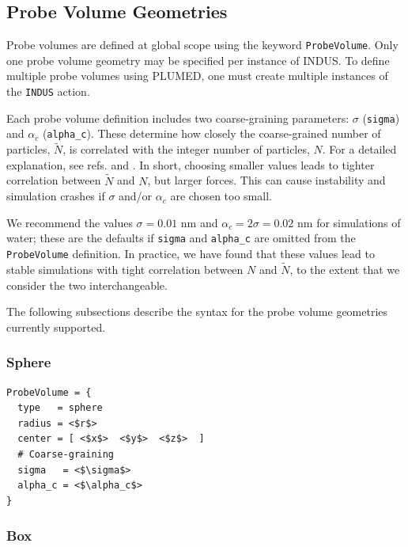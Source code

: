\documentclass[11pt,notitlepage]{article}
\begin{document}

\subsection{Probe Volume Geometries}

Probe volumes are defined at global scope using the keyword \texttt{ProbeVolume}. Only one probe volume geometry may be specified per instance of INDUS. To define multiple probe volumes using PLUMED, one must create multiple instances of the \texttt{INDUS} action.

Each probe volume definition includes two coarse-graining parameters: $\sigma$
(\texttt{sigma}) and $\alpha_c$ (\texttt{alpha\_c}). These determine how closely the coarse-grained number of particles, $\tilde{N}$, is correlated with the integer number of particles, $N$. For a detailed explanation, see refs. \cite{Patel2010} and \cite{Patel2012}. In short, choosing smaller values leads to tighter correlation between $\tilde{N}$ and $N$, but larger forces. This can cause instability and simulation crashes if $\sigma$ and/or $\alpha_c$ are chosen too small. 

We recommend the values $\sigma = 0.01$ nm and $\alpha_c = 2 \sigma = 0.02$ nm for simulations of water; these are the defaults if \texttt{sigma} and \texttt{alpha\_c} are omitted from the \texttt{ProbeVolume} definition. In practice, we have found that these values lead to stable simulations with tight correlation between $N$ and $\tilde{N}$, to the extent that we consider the two interchangeable.

The following subsections describe the syntax for the probe volume geometries currently supported.


\subsubsection{Sphere}

\begin{lstlisting}
ProbeVolume = {
  type   = sphere
  radius = <$r$>
  center = [ <$x$>  <$y$>  <$z$>  ]
  # Coarse-graining
  sigma   = <$\sigma$>
  alpha_c = <$\alpha_c$>
}
\end{lstlisting}


\subsubsection{Box}
\end{document}
